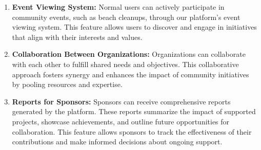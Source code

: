 \begin{enumerate}
    \item \textbf{Event Viewing System:} Normal users can actively participate in community events, such as beach cleanups, through our platform's event viewing system. This feature allows users to discover and engage in initiatives that align with their interests and values.

    \item \textbf{Collaboration Between Organizations:} Organizations can collaborate with each other to fulfill shared needs and objectives. This collaborative approach fosters synergy and enhances the impact of community initiatives by pooling resources and expertise.

    \item \textbf{Reports for Sponsors:} Sponsors can receive comprehensive reports generated by the platform. These reports summarize the impact of supported projects, showcase achievements, and outline future opportunities for collaboration. This feature allows sponsors to track the effectiveness of their contributions and make informed decisions about ongoing support.



\end{enumerate}
